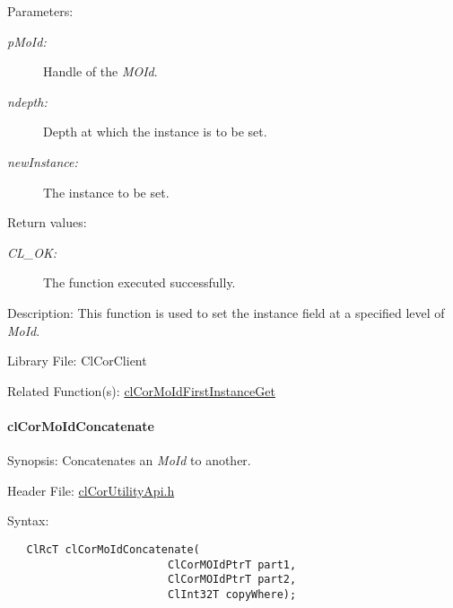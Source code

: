 \begin{Desc}
\item[Parameters:]
\begin{description}
\item[{\em p\-Mo\-Id:}]Handle of the {\em MOId\/}. \item[{\em ndepth:}]Depth at which the instance is to be set. \item[{\em new\-Instance:}]The instance to be set.\end{description}
\end{Desc}
\begin{Desc}
\item[Return values:]
\begin{description}
\item[{\em CL\_\-OK:}]The function executed successfully.\end{description}
\end{Desc}
\begin{Desc}
\item[Description:]This function is used to set the instance field at a specified level of {\em Mo\-Id\/}.\end{Desc}
\begin{Desc}
\item[Library File:]Cl\-Cor\-Client\end{Desc}
\begin{Desc}
\item[Related Function(s):]\hyperlink{group__group13}{cl\-Cor\-Mo\-Id\-First\-Instance\-Get} \end{Desc}
\hypertarget{pagecor252}{}\paragraph{cl\-Cor\-Mo\-Id\-Concatenate}\label{pagecor252}
\begin{Desc}
\item[Synopsis:]Concatenates an {\em Mo\-Id\/} to another.\end{Desc}
\begin{Desc}
\item[Header File:]\hyperlink{cl_cor_utility_api_8h}{cl\-Cor\-Utility\-Api.h}\end{Desc}
\begin{Desc}
\item[Syntax:]

\footnotesize\begin{verbatim}   ClRcT clCorMoIdConcatenate(
                         ClCorMOIdPtrT part1,
                         ClCorMOIdPtrT part2, 
                         ClInt32T copyWhere);
\end{verbatim}
\normalsize
\end{Desc}
